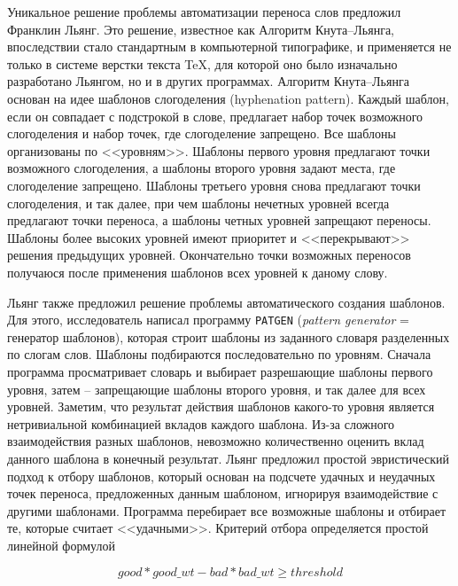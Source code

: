 \documentclass[12pt,a4paper,oneside]{extarticle}
\begin{document}
Уникальное решение проблемы автоматизации переноса слов предложил Франклин Льянг\autocite[][]{liang1983}. Это решение, известное как Алгоритм Кнута--Льянга, впоследствии стало стандартным в компьютерной типографике, и применяется не только в системе верстки текста \TeX{}, для которой оно было изначально разработано Льянгом, но и в других программах\autocite[Первое описание системы \TeX{} см. ][]{knuth1979}. Алгоритм Кнута--Льянга основан на идее шаблонов слогоделения (\textenglish{hyphenation pattern}).
Каждый шаблон, если он совпадает с подстрокой в слове, предлагает набор точек возможного слогоделения и набор точек, где слогоделение запрещено. Все шаблоны организованы по <<уровням>>. Шаблоны первого уровня предлагают точки возможного слогоделения, а шаблоны второго уровня
задают места, где слогоделение запрещено. Шаблоны третьего уровня снова предлагают точки слогоделения, и так далее, при чем шаблоны нечетных уровней
всегда предлагают точки переноса, а шаблоны четных уровней запрещают переносы. 
Шаблоны более высоких уровней имеют приоритет и <<перекрывают>>
решения предыдущих уровней. Окончательно точки возможных переносов
получаюся после применения шаблонов всех уровней к даному слову. %

Льянг также предложил решение проблемы автоматического создания шаблонов. Для этого, исследователь написал программу \verb+PATGEN+ (\emph{pattern generator} = генератор шаблонов), которая строит шаблоны из заданного словаря разделенных по слогам слов. Шаблоны подбираются последовательно по уровням. Сначала программа просматривает словарь и выбирает разрешающие шаблоны первого уровня, затем -- запрещающие шаблоны второго уровня, и так далее для всех уровней. Заметим, что результат действия шаблонов какого-то уровня
является нетривиальной комбинацией вкладов каждого шаблона. Из-за сложного взаимодействия разных шаблонов, невозможно
количественно оценить вклад данного шаблона в конечный результат. Льянг предложил простой эвристический подход к отбору шаблонов,
который основан на подсчете удачных и неудачных точек переноса, предложенных данным шаблоном, игнорируя взаимодействие с другими шаблонами. Программа перебирает все возможные шаблоны и отбирает те, которые считает <<удачными>>. Критерий отбора определяется простой линейной формулой

\begin{equation}
\label{eff_formula}
good * good\_wt - bad * bad\_wt \geq threshold
\end{equation}
\end{document}
